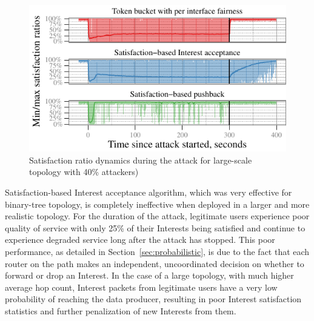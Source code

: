 \documentclass[10pt,conference]{IEEEtran}
\begin{document}
{%

\begin{figure}[t]
 \centering
 \includegraphics[scale=0.8]{paper-topo-7018-gw/7018-r0-good-0-producer-gw}
 \caption{Satisfaction ratio dynamics during the attack for large-scale topology with 40\% attackers)}
 \label{fig:large-scale}
\end{figure}

Satisfaction-based Interest acceptance algorithm, which was very effective for binary-tree topology, is completely ineffective when deployed in a larger and more realistic topology.  For the duration of the attack, legitimate users experience poor quality of service with only 25\% of their Interests being satisfied and continue to experience degraded service long after the attack has stopped. This poor performance, as detailed in Section~\ref{sec:probabilistic}, is due to the fact that each router on the path makes an independent, uncoordinated decision on whether to forward or drop an Interest. In the case of a large topology, with much higher average hop count, Interest packets from legitimate users have a very low probability of reaching the data producer, resulting in poor Interest satisfaction statistics and further penalization of new Interests from them.

}
\end{document}
